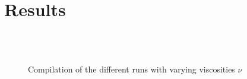 \chapter{Results}\label{Chap:Results}

\begin{figure}
 \centering 
 {}
 {}\\
 {}
 {}\\
 {}
 {}
 \caption{Compilation of the different runs with varying viscosities $\nu$}
 \label{Fig:visc_grid}
\end{figure}

